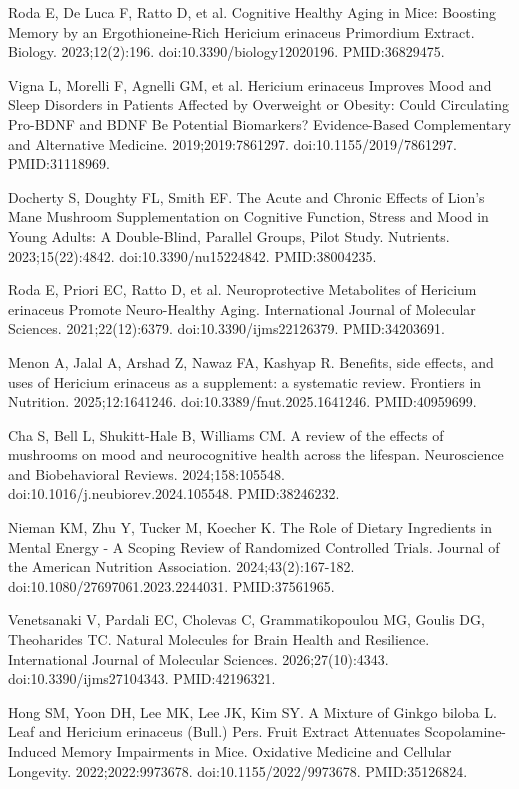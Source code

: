 \documentclass[12pt,oneside]{book}
\newcommand{\reff}[2]{\par\hangindent=7mm\hangafter=1\noindent[#1]\hspace{2mm}#2\par}
\begin{document}
\reff{46}{Roda E, De Luca F, Ratto D, et al. Cognitive Healthy Aging in Mice: Boosting Memory by an Ergothioneine-Rich Hericium erinaceus Primordium Extract. Biology. 2023;12(2):196. doi:10.3390/biology12020196. PMID:36829475.}

\reff{47}{Vigna L, Morelli F, Agnelli GM, et al. Hericium erinaceus Improves Mood and Sleep Disorders in Patients Affected by Overweight or Obesity: Could Circulating Pro-BDNF and BDNF Be Potential Biomarkers? Evidence-Based Complementary and Alternative Medicine. 2019;2019:7861297. doi:10.1155/2019/7861297. PMID:31118969.}

\reff{48}{Docherty S, Doughty FL, Smith EF. The Acute and Chronic Effects of Lion's Mane Mushroom Supplementation on Cognitive Function, Stress and Mood in Young Adults: A Double-Blind, Parallel Groups, Pilot Study. Nutrients. 2023;15(22):4842. doi:10.3390/nu15224842. PMID:38004235.}

\reff{49}{Roda E, Priori EC, Ratto D, et al. Neuroprotective Metabolites of Hericium erinaceus Promote Neuro-Healthy Aging. International Journal of Molecular Sciences. 2021;22(12):6379. doi:10.3390/ijms22126379. PMID:34203691.}

\reff{50}{Menon A, Jalal A, Arshad Z, Nawaz FA, Kashyap R. Benefits, side effects, and uses of Hericium erinaceus as a supplement: a systematic review. Frontiers in Nutrition. 2025;12:1641246. doi:10.3389/fnut.2025.1641246. PMID:40959699.}

\reff{51}{Cha S, Bell L, Shukitt-Hale B, Williams CM. A review of the effects of mushrooms on mood and neurocognitive health across the lifespan. Neuroscience and Biobehavioral Reviews. 2024;158:105548. doi:10.1016/j.neubiorev.2024.105548. PMID:38246232.}

\reff{52}{Nieman KM, Zhu Y, Tucker M, Koecher K. The Role of Dietary Ingredients in Mental Energy - A Scoping Review of Randomized Controlled Trials. Journal of the American Nutrition Association. 2024;43(2):167-182. doi:10.1080/27697061.2023.2244031. PMID:37561965.}

\reff{53}{Venetsanaki V, Pardali EC, Cholevas C, Grammatikopoulou MG, Goulis DG, Theoharides TC. Natural Molecules for Brain Health and Resilience. International Journal of Molecular Sciences. 2026;27(10):4343. doi:10.3390/ijms27104343. PMID:42196321.}

\reff{54}{Hong SM, Yoon DH, Lee MK, Lee JK, Kim SY. A Mixture of Ginkgo biloba L. Leaf and Hericium erinaceus (Bull.) Pers. Fruit Extract Attenuates Scopolamine-Induced Memory Impairments in Mice. Oxidative Medicine and Cellular Longevity. 2022;2022:9973678. doi:10.1155/2022/9973678. PMID:35126824.}
\end{document}

